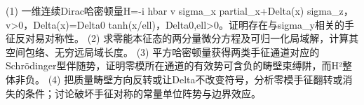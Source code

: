 (1) 一维连续Dirac哈密顿量H=-i hbar v sigma_x partial_x+Delta(x) sigma_z，v>0，Delta(x)=Delta0 tanh(x/ell)，Delta0,ell>0。证明存在与sigma_y相关的手征反对易对称性。
(2) 求零能本征态的两分量微分方程及可归一化局域解，计算其空间包络、无穷远局域长度。
(3) 平方哈密顿量获得两类手征通道对应的Schrödinger型伴随势，证明零模所在通道的有效势可含负的畴壁束缚阱，而H²整体非负。
(4) 把质量畴壁方向反转或让Delta不改变符号，分析零模手征翻转或消失的条件；讨论破坏手征对称的常量单位阵势与边界效应。

